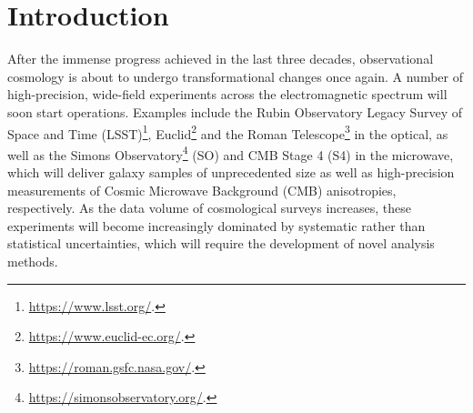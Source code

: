 \documentclass[%
 reprint,
nofootinbib,
 amsmath,amssymb,
 aps,
]{revtex4-1}
\begin{document}

\section{Introduction}\label{sec:intro}

After the immense progress achieved in the last three decades, observational cosmology is about to undergo transformational changes once again. A number of high-precision, wide-field experiments across the electromagnetic spectrum will soon start operations. Examples include the Rubin Observatory Legacy Survey of Space and Time (LSST)\footnote{\url{https://www.lsst.org/}.}, Euclid\footnote{\url{https://www.euclid-ec.org/}.} and the Roman Telescope\footnote{\url{https://roman.gsfc.nasa.gov/}.} in the optical, as well as the Simons Observatory\footnote{\url{https://simonsobservatory.org/}.} (SO) and CMB Stage 4 (S4) in the microwave, which will deliver galaxy samples of unprecedented size as well as high-precision measurements of Cosmic Microwave Background (CMB) anisotropies, respectively. As the data volume of cosmological surveys increases, these experiments will become increasingly dominated by systematic rather than statistical uncertainties, which will require the development of novel analysis methods.
\end{document}
